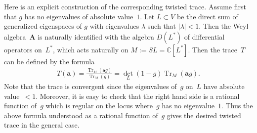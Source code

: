 \documentclass[pdftex]{sigma}
\numberwithin{equation}{section}
\begin{document}
\begin{Example}
Here is an explicit construction of the corresponding twisted trace. Assume first that $g$ has no eigenvalues of absolute value~$1$. Let $L\subset V$ be the direct sum of generalized eigenspaces of $g$ with eigenvalues $\lambda$ such that $|\lambda|<1$. Then the Weyl algebra~${\mathbf A}$ is naturally identified with the algebra $D(L^*)$ of differential operators on~$L^*$, which acts naturally on $M:=SL={\mathbb C}[L^*]$. Then the trace~$T$ can be defined by the formula
\begin{gather*}
T({\mathbf a})=\frac{\operatorname{Tr}_M({\mathbf a} g)}{\operatorname{Tr}_M(g)}={\det}_L(1-g)\operatorname{Tr}_M({\mathbf a} g).
\end{gather*}
Note that the trace is convergent since the eigenvalues of~$g$ on~$L$ have absolute value~$<1$. Moreover, it is easy to check that the right hand side is a rational function of~$g$ which is regular on the locus where~$g$ has no eigenvalue~$1$. Thus the above formula understood as a rational function of~$g$ gives the desired twisted trace in the general case.
\end{Example}
\end{document}
